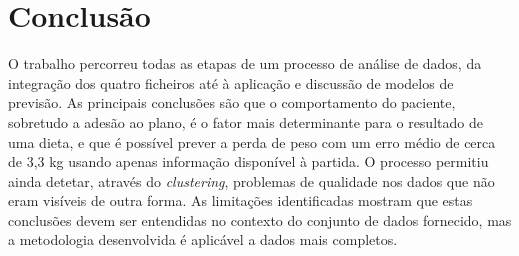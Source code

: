 \section{Conclusão}
O trabalho percorreu todas as etapas de um processo de análise de dados, da integração dos quatro ficheiros até à aplicação e discussão de modelos de previsão. As principais conclusões são que o comportamento do paciente, sobretudo a adesão ao plano, é o fator mais determinante para o resultado de uma dieta, e que é possível prever a perda de peso com um erro médio de cerca de 3,3 kg usando apenas informação disponível à partida. O processo permitiu ainda detetar, através do \textit{clustering}, problemas de qualidade nos dados que não eram visíveis de outra forma. As limitações identificadas mostram que estas conclusões devem ser entendidas no contexto do conjunto de dados fornecido, mas a metodologia desenvolvida é aplicável a dados mais completos.
